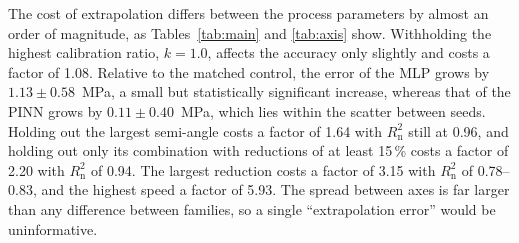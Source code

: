 \documentclass[subscriptcorrection,upint,varvw,barcolor=Goldenrod3,mathalfa=cal=euler,balance,hyphenate,french,pdf-a]{asmejour} %
\begin{document}
The cost of extrapolation differs between the process parameters by almost an order of magnitude, as Tables~\ref{tab:main} and \ref{tab:axis} show. Withholding the highest calibration ratio, $k=1.0$, affects the accuracy only slightly and costs a factor of 1.08. Relative to the matched control, the error of the MLP grows by $1.13\pm0.58$~MPa, a small but statistically significant increase, whereas that of the PINN grows by $0.11\pm0.40$~MPa, which lies within the scatter between seeds. %
Holding out the largest semi-angle costs a factor of 1.64 with $R^2_{\mathrm{n}}$ still at 0.96, and holding out only its combination with reductions of at least 15\,\% costs a factor of 2.20 with $R^2_{\mathrm{n}}$ of 0.94. The largest reduction costs a factor of 3.15 with $R^2_{\mathrm{n}}$ of 0.78--0.83, and the highest speed a factor of 5.93. The spread between axes is far larger than any difference between families, so a single ``extrapolation error'' would be uninformative. %
\end{document}
